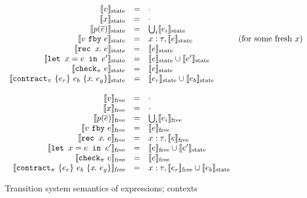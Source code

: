 
\newcommand{\sysinit}[1]{\systrans{#1}_{\text{init}}}
\newcommand{\sysvalue}[1]{\systrans{#1}_{\text{value}}}
\newcommand{\sysupdate}[1]{\systrans{#1}_{\text{update}}}
\newcommand{\sysrely}[1]{\systrans{#1}_{\text{rely}}}
\newcommand{\sysguar}[1]{\systrans{#1}_{\text{guar}}}
\newcommand{\xctr}{\xcontractP{\PStatus}{e_r}{e_b}{\rawbind{x}{e_g}}}

\newcommand{\sysstate}[1]{\systrans{#1}_{\text{state}}}
\newcommand{\sysoracle}[1]{\systrans{#1}_{\text{free}}}

\begin{figure}
  \small
  \[
  \begin{array}{rrlr}
    \sysstate{v} & = & \cdot \\
    \sysstate{x} & = & \cdot \\
    \sysstate{p(\ov{e})} & = & \bigcup_i \sysstate{e_i} \\

    \sysstate{\xfby{v}{e}} & = & x: \tau, \sysstate{e} & \text{(for some fresh $x$)} \\

    \sysstate{\xrec{x}{e}} & = & \sysstate{e} \\

    \sysstate{\xlet{x}{e}{e'}} & = & \sysstate{e} \cup \sysstate{e'} \\

    \sysstate{\xcheckP{\PStatus}{e}} & = & \sysstate{e} \\

    \sysstate{\xctr} & = & \sysstate{e_r} \cup \sysstate{e_b} \\
    \\
    \sysoracle{v} & = & \cdot \\
    \sysoracle{x} & = & \cdot \\
    \sysoracle{p(\ov{e})} & = & \bigcup_i \sysoracle{e_i} \\
    \sysoracle{\xfby{v}{e}} & = & \sysoracle{e} \\
    \sysoracle{\xrec{x}{e}} & = & x: \tau, \sysoracle{e} \\
    \sysoracle{\xlet{x}{e}{e'}} & = & \sysoracle{e} \cup \sysstate{e'} \\
    \sysoracle{\xcheckP{\PStatus}{e}} & = & \sysoracle{e} \\
    \sysoracle{\xctr} & = & x: \tau, \sysoracle{e_r} \cup \sysstate{e_b} \\
  \end{array}
\]
\caption{Transition system semantics of expressions; contexts}
\label{f:system-translation-contexts}
\end{figure}

